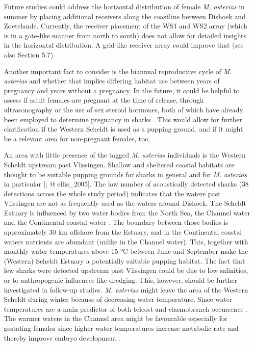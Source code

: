 \documentclass[
  authoryear,
  review,
  3p]{elsarticle}
\begin{document}
Future studies could address the horizontal distribution of female
\emph{M. asterias} in summer by placing additional receivers along the
coastline between Dishoek and Zoetelande. Currently, the receiver
placement of the WS1 and WS2 array (which is in a gate-like manner from
north to south) does not allow for detailed insights in the horizontal
distribution. A grid-like receiver array could improve that (see also
Section 5.7).

Another important fact to consider is the biannual reproductive cycle of
\emph{M. asterias} and whether that implies differing habitat use
between years of pregnancy and years without a pregnancy. In the future,
it could be helpful to assess if adult females are pregnant at the time
of release, through ultrasonography or the use of sex steroid hormones,
both of which have already been employed to determine pregnancy in
sharks \citep{awruch_2014, anderson_2018, fujinami_2020, fujinami_2021}.
This would allow for further clarification if the Western Scheldt is
used as a pupping ground, and if it might be a relevant area for
non-pregnant females, too.

An area with little presence of the tagged \emph{M. asterias}
individuals is the Western Scheldt upstream past Vlissingen. Shallow and
sheltered coastal habitats are thought to be suitable pupping grounds
for sharks in general \citep{speed_2010} and for \emph{M. asterias} in
particular {[}\citet{ellis_2004}; @ ellis\_2005{]}. The low number of
acoustically detected sharks (38 detections across the whole study
period) indicates that the waters past Vlissingen are not as frequently
used as the waters around Dishoek. The Scheldt Estuary is influenced by
two water bodies from the North Sea, the Channel water and the
Continental coastal water \citep[see @ sec-mmscheldtBPNS]{wolff_1973}.
The boundary between those bodies is approximately 30 km offshore from
the Estuary, and in the Continental coastal waters nutrients are
abundant (unlike in the Channel water). This, together with monthly
water temperatures above 15 °C between June and September make the
(Western) Scheldt Estuary a potentially suitable pupping habitat. The
fact that few sharks were detected upstream past Vlissingen could be due
to low salinities, or to anthropogenic influences like dredging. This,
however, should be further investigated in follow-up studies. \emph{M.
asterias} might leave the area of the Western Scheldt during winter
because of decreasing water temperature. Since water temperatures are a
main predictor of both teleost and elasmobranch occurrence
\citep{thiel_1995, martin_2010}. The warmer waters in the Channel area
might be favourable especially for gestating females since higher water
temperatures increase metabolic rate and thereby improve embryo
development \citep{hurst_1999}.
\end{document}
